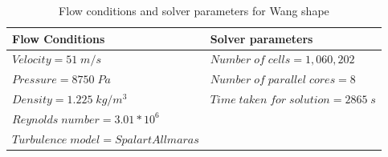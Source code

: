 \begin{table}[H]
	\caption{Flow conditions and solver parameters for Wang shape}
	\label{Flow conditions and solver parametres for Wang shape}
	\centering
	\begin{tabular}{ll}
		\hline \hline
		Flow Conditions & Solver parameters  \\ \hline \hline
		
		$ Velocity = 51 \; m/s$ & $Number \; of \; cells = 1,060,202$    \\  
		$ Pressure = 8750 \; Pa $ & $ Number \; of \; parallel \; cores = 8 $     \\
		$ Density = 1.225 \; kg/m^{3} $ & $ Time \; taken \; for \; solution = 2865 \; s  $    \\
		$ Reynolds \; number = 3.01 * 10^{6} $ &    \\
		$ Turbulence \; model = Spalart Allmaras $ &     \\
		\hline
	\end{tabular}
\end{table}


